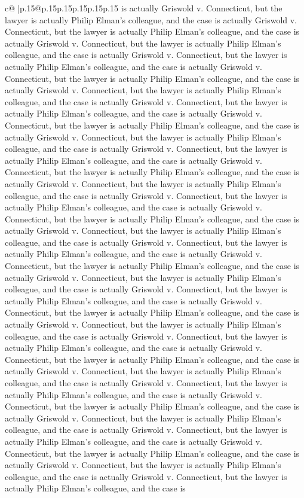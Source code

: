 \documentclass{article}
\begin{document}
{\begin{supertabular}{c@{$\;$}|p{.15\linewidth}@{}p{.15\linewidth}p{.15\linewidth}p{.15\linewidth}p{.15\linewidth}p{.15\linewidth}}
{{{is actually Griswold v. Connecticut, but the lawyer is actually Philip Elman's colleague, and the case is actually Griswold v. Connecticut, but the lawyer is actually Philip Elman's colleague, and the case is actually Griswold v. Connecticut, but the lawyer is actually Philip Elman's colleague, and the case is actually Griswold v. Connecticut, but the lawyer is actually Philip Elman's colleague, and the case is actually Griswold v. Connecticut, but the lawyer is actually Philip Elman's colleague, and the case is actually Griswold v. Connecticut, but the lawyer is actually Philip Elman's colleague, and the case is actually Griswold v. Connecticut, but the lawyer is actually Philip Elman's colleague, and the case is actually Griswold v. Connecticut, but the lawyer is actually Philip Elman's colleague, and the case is actually Griswold v. Connecticut, but the lawyer is actually Philip Elman's colleague, and the case is actually Griswold v. Connecticut, but the lawyer is actually Philip Elman's colleague, and the case is actually Griswold v. Connecticut, but the lawyer is actually Philip Elman's colleague, and the case is actually Griswold v. Connecticut, but the lawyer is actually Philip Elman's colleague, and the case is actually Griswold v. Connecticut, but the lawyer is actually Philip Elman's colleague, and the case is actually Griswold v. Connecticut, but the lawyer is actually Philip Elman's colleague, and the case is actually Griswold v. Connecticut, but the lawyer is actually Philip Elman's colleague, and the case is actually Griswold v. Connecticut, but the lawyer is actually Philip Elman's colleague, and the case is actually Griswold v. Connecticut, but the lawyer is actually Philip Elman's colleague, and the case is actually Griswold v. Connecticut, but the lawyer is actually Philip Elman's colleague, and the case is actually Griswold v. Connecticut, but the lawyer is actually Philip Elman's colleague, and the case is actually Griswold v. Connecticut, but the lawyer is actually Philip Elman's colleague, and the case is actually Griswold v. Connecticut, but the lawyer is actually Philip Elman's colleague, and the case is actually Griswold v. Connecticut, but the lawyer is actually Philip Elman's colleague, and the case is actually Griswold v. Connecticut, but the lawyer is actually Philip Elman's colleague, and the case is actually Griswold v. Connecticut, but the lawyer is actually Philip Elman's colleague, and the case is actually Griswold v. Connecticut, but the lawyer is actually Philip Elman's colleague, and the case is actually Griswold v. Connecticut, but the lawyer is actually Philip Elman's colleague, and the case is actually Griswold v. Connecticut, but the lawyer is actually Philip Elman's colleague, and the case is actually Griswold v. Connecticut, but the lawyer is actually Philip Elman's colleague, and the case is actually Griswold v. Connecticut, but the lawyer is actually Philip Elman's colleague, and the case is actually Griswold v. Connecticut, but the lawyer is actually Philip Elman's colleague, and the case is actually Griswold v. Connecticut, but the lawyer is actually Philip Elman's colleague, and the case is }}}
\end{supertabular}}
\end{document}
